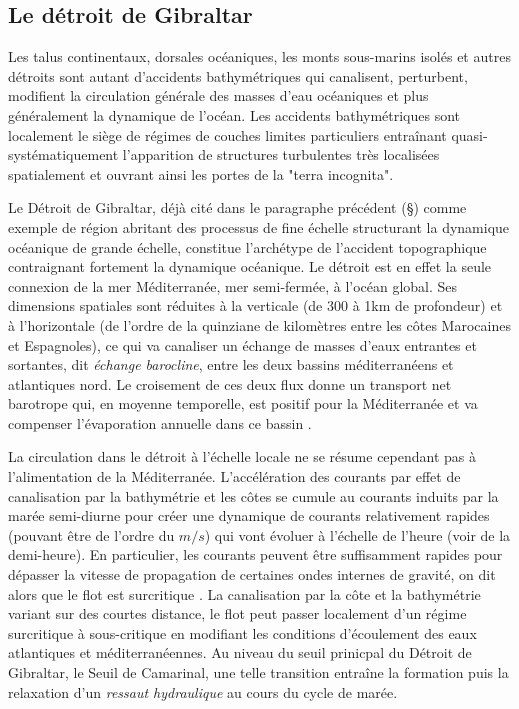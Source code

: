 
\subsection{Le détroit de Gibraltar}
\color{blue}
Les talus continentaux, dorsales océaniques, les monts sous-marins isolés et autres détroits sont autant d'accidents bathymétriques qui canalisent, perturbent, modifient la circulation générale des masses d'eau océaniques et plus généralement la dynamique de l'océan. Les accidents bathymétriques sont localement le siège de régimes de couches limites particuliers entraînant quasi-systématiquement l'apparition de structures turbulentes très localisées spatialement et ouvrant ainsi les portes de la "terra incognita".

Le Détroit de Gibraltar, déjà cité dans le paragraphe précédent (\S {}) comme exemple de région abritant des processus de fine échelle structurant la dynamique océanique de grande échelle, constitue l'archétype de l'accident topographique contraignant fortement la dynamique océanique. \color{red}Le détroit est en effet la seule connexion de la mer Méditerranée, mer semi-fermée, à l'océan global. Ses dimensions spatiales sont réduites à la verticale (de 300 à 1km de profondeur) et à l'horizontale (de l'ordre de la quinziane de kilomètres entre les côtes Marocaines et Espagnoles), ce qui va canaliser un échange de masses d'eaux entrantes et sortantes, dit \textit{échange barocline}, entre les deux bassins méditerranéens et atlantiques nord. Le croisement de ces deux flux donne un transport net barotrope qui, en moyenne temporelle, est positif pour la Méditerranée et va compenser l'évaporation annuelle dans ce bassin \citep{bryden_1994}.

La circulation dans le détroit à l'échelle locale ne se résume cependant pas à l'alimentation de la Méditerranée. L'accélération des courants par effet de canalisation par la bathymétrie et les côtes se cumule au courants induits par la marée semi-diurne pour créer une dynamique de courants relativement rapides (pouvant être de l'ordre du $m/s$) qui vont évoluer à l'échelle de l'heure (voir de la demi-heure). En particulier, les courants peuvent être suffisamment rapides pour dépasser la vitesse de propagation de certaines ondes internes de gravité, on dit alors que le flot est surcritique \citep{Baines1995}. La canalisation par la côte et la bathymétrie variant sur des courtes distance, le flot peut passer localement d'un régime surcritique à sous-critique en modifiant les conditions d'écoulement des eaux atlantiques et méditerranéennes. Au niveau du seuil prinicpal du Détroit de Gibraltar, le Seuil de Camarinal, une telle transition entraîne la formation puis la relaxation d'un \textit{ressaut hydraulique} au cours du cycle de marée.

